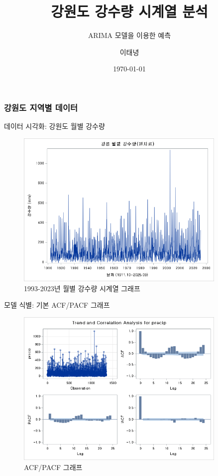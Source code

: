 \documentclass{beamer}
\title{강원도 강수량 시계열 분석}
\subtitle{ARIMA 모델을 이용한 예측}
\author{이태녕}
\date{\today}
\begin{document}
\begin{frame}
    \titlepage
\end{frame}

\frametitle{강원도 지역별 데이터}

\begin{frame}{데이터 시각화: 강원도 월별 강수량}
    \begin{figure}
        \includegraphics[width=0.9\textwidth]{alldata.png}
        \caption{1993-2023년 월별 강수량 시계열 그래프}
    \end{figure}
\end{frame}


\begin{frame}{모델 식별: 기본 ACF/PACF 그래프}
    \begin{figure}
        \includegraphics[width=0.9\textwidth]{alldata_acf.png}
        \caption{ACF/PACF 그래프}
    \end{figure}
\end{frame}
\end{document}
